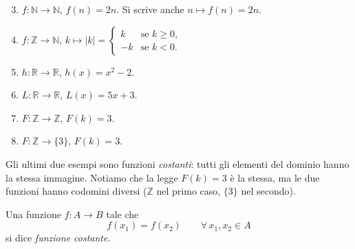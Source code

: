 \documentclass[11pt,a4paper]{article}
\begin{document}
\begin{esempio}
\begin{enumerate}
    \setcounter{enumi}{2}
    \item $f : \mathbb{N} \to \mathbb{N}$, \quad $f(n) = 2n$.
          Si scrive anche $n \mapsto f(n) = 2n$.

    \item $f : \mathbb{Z} \to \mathbb{N}$, \quad
          $k \mapsto |k| =
          \begin{cases}
            k & \text{se } k \geq 0, \\
            -k & \text{se } k < 0.
          \end{cases}$

    \item $h : \mathbb{R} \to \mathbb{R}$, \quad $h(x) = x^2 - 2$.

    \item $L : \mathbb{R} \to \mathbb{R}$, \quad $L(x) = 5x + 3$.

    \item $F : \mathbb{Z} \to \mathbb{Z}$, \quad $F(k) = 3$.

    \item $F : \mathbb{Z} \to \{3\}$, \quad $F(k) = 3$.
\end{enumerate}
\end{esempio}

Gli ultimi due esempi sono funzioni \emph{costanti}: tutti gli elementi del
dominio hanno la stessa immagine. Notiamo che la legge $F(k) = 3$ è la
stessa, ma le due funzioni hanno codomini diversi ($\mathbb{Z}$ nel primo
caso, $\{3\}$ nel secondo).

\begin{definizione}
Una funzione $f : A \to B$ tale che
\[
f(x_1) = f(x_2) \qquad \forall\, x_1, x_2 \in A
\]
si dice \emph{funzione costante}.
\end{definizione}
\end{document}
